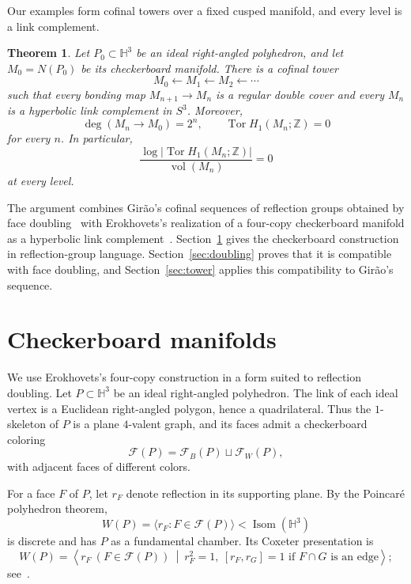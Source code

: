 \documentclass[11pt,a4paper]{amsart}
\newcommand{\HH}{\mathbb H}
\newcommand{\ZZ}{\mathbb Z}
\newcommand{\cF}{\mathcal F}
\newcommand{\Tor}{\operatorname{Tor}}
\newcommand{\vol}{\operatorname{vol}}
\newcommand{\Isom}{\operatorname{Isom}}
\theoremstyle{plain}
\newtheorem{theorem}{Theorem}[section]
\theoremstyle{remark}
\begin{document}
Our examples form cofinal towers over a fixed cusped manifold, and every level is a link complement.

\begin{theorem}\label{thm:main}
Let $P_0\subset\HH^3$ be an ideal right-angled polyhedron, and let $M_0=N(P_0)$ be its checkerboard manifold.  There is a cofinal tower
\begin{equation}\label{eq:main-tower}
  M_0 \longleftarrow M_1 \longleftarrow M_2 \longleftarrow \cdots
\end{equation}
such that every bonding map $M_{n+1}\to M_n$ is a regular double cover and every $M_n$ is a hyperbolic link complement in $S^3$.  Moreover,
\[
  \deg(M_n\to M_0)=2^n,
  \qquad
  \Tor H_1(M_n;\ZZ)=0
\]
for every $n$.  In particular,
\[
  \frac{\log |\Tor H_1(M_n;\ZZ)|}{\vol(M_n)}=0
\]
at every level.
\end{theorem}

The argument combines Gir\~ao's cofinal sequences of reflection groups obtained by face doubling~\cite{Girao} with Erokhovets's realization of a four-copy checkerboard manifold as a hyperbolic link complement~\cite{Erokhovets}.  Section~\ref{sec:checkerboard} gives the checkerboard construction in reflection-group language.  Section~\ref{sec:doubling} proves that it is compatible with face doubling, and Section~\ref{sec:tower} applies this compatibility to Gir\~ao's sequence.

\section{Checkerboard manifolds}\label{sec:checkerboard}

We use Erokhovets's four-copy construction in a form suited to
reflection doubling.  Let $P\subset\HH^3$ be an ideal right-angled
polyhedron.  The link of each ideal vertex is a Euclidean right-angled
polygon, hence a quadrilateral.  Thus the $1$-skeleton of $P$ is a
plane $4$-valent graph, and its faces admit a checkerboard coloring
\begin{equation}\label{eq:checkerboard-coloring}
  \cF(P)=\cF_B(P)\sqcup\cF_W(P),
\end{equation}
with adjacent faces of different colors.

For a face $F$ of $P$, let $r_F$ denote reflection in its supporting
plane.  By the Poincar\'e polyhedron theorem,
\[
  W(P)=\langle r_F:F\in\cF(P)\rangle<\Isom(\HH^3)
\]
is discrete and has $P$ as a fundamental chamber.  Its Coxeter
presentation is
\begin{equation}\label{eq:Coxeter-presentation}
  W(P)=\left\langle
  r_F\ (F\in\cF(P))
  \ \middle|\
  r_F^2=1,\ [r_F,r_G]=1\text{ if }F\cap G\text{ is an edge}
  \right\rangle;
\end{equation}
see~\cite[Chapter~6]{Davis}.
\end{document}
